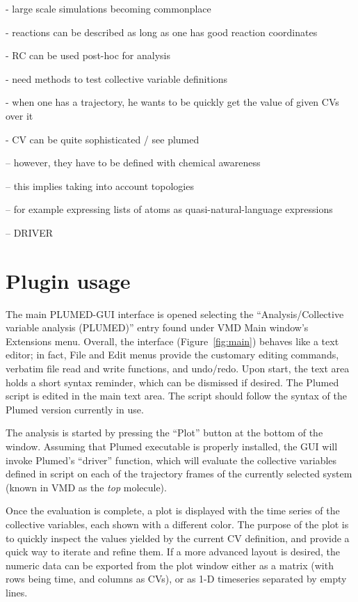 \documentclass[preprint,12pt]{elsarticle}
\begin{document}
- large scale simulations becoming commonplace

- reactions can be described as long as one has good reaction coordinates

- RC can be used post-hoc for analysis

- need methods to test collective variable definitions

- when one has a trajectory, he wants to be quickly get the value of given CVs over it

- CV can be quite sophisticated / see plumed 

-- however, they have to be defined with chemical awareness

-- this implies taking into account topologies

-- for example expressing lists of atoms as quasi-natural-language expressions

-- DRIVER


\section{Plugin usage}

The main PLUMED-GUI interface is opened selecting the
``Analysis/Collective variable analysis (PLUMED)'' entry found under
VMD Main window's Extensions menu. Overall, the interface
(Figure~\ref{fig:main}) behaves like a text editor; in fact, File and
Edit menus provide the customary editing commands, verbatim file read
and write functions, and undo/redo.  Upon start, the text area holds a
short syntax reminder, which can be dismissed if desired. The Plumed
script is edited in the main text area.  The script should follow the
syntax of the Plumed version currently in use.

The analysis is started by pressing the ``Plot'' button at the bottom
of the window. Assuming that Plumed executable is properly installed,
the GUI will invoke Plumed's ``driver'' function, which will evaluate
the collective variables defined in script on each of the trajectory
frames of the currently selected system (known in VMD as the
\emph{top} molecule).

Once the evaluation is complete, a plot is displayed with the time
series of the collective variables, each shown with a different color.
The purpose of the plot is to quickly inspect the values yielded by
the current CV definition, and provide a quick way to iterate and
refine them.  If a more advanced layout is desired, the numeric data
can be exported from the plot window either as a matrix (with rows
being time, and columns as CVs), or as 1-D timeseries separated by
empty lines.
\end{document}
